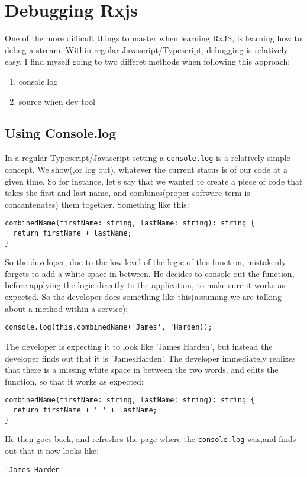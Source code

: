 \chapter{ Debugging Rxjs }
One of the more difficult things to master when learning RxJS, is learning how to debug a stream. Within regular Javascript/Typescript, debugging is relatively easy. I find myself going to two differet methods when following this approach: 
\begin{enumerate}
  \item console.log
  \item source when dev tool
\end{enumerate}

\section{Using Console.log}
In a regular Typescript/Javascript setting a \lstinline{console.log} is a relatively simple concept. We show(,or log out), whatever the current status is of our code at a given time. So for instance, let's say that we wanted to create a piece of code that takes the first and last name, and combines(proper software term is concantenates) them together. Something like this: 
\begin{lstlisting}[caption=console in action]
combinedName(firstName: string, lastName: string): string {
  return firstName + lastName;
}
\end{lstlisting}

So the developer, due to the low level of the logic of this function, mistakenly forgets to add a white space in between. He decides to console out the function, before applying the logic directly to the application, to make sure it works as expected. So the developer does something like this(assuming we are talking about a method within a service): 
\begin{lstlisting}
console.log(this.combinedName('James', 'Harden));
\end{lstlisting}

The developer is expecting it to look like 'James Harden', but instead the developer finds out that it is 'JamesHarden'. The developer immediately realizes that there is a missing white space in between the two words, and edits the function, so that it works as expected: 

\begin{lstlisting}
combinedName(firstName: string, lastName: string): string {
  return firstName + ' ' + lastName;
} 
\end{lstlisting}
He then goes back, and refreshes the page where the \lstinline{console.log} was,and finds out that it now looks like: 
\begin{verbatim}
'James Harden'  
\end{verbatim}

